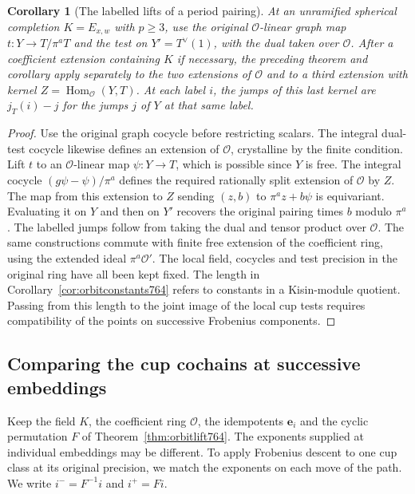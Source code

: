 \documentclass[a4paper,11pt]{article}
\newtheorem{corollary}[proposition]{Corollary}
\theoremstyle{definition}
\theoremstyle{remark}
\numberwithin{equation}{section}
\begin{document}
\begin{corollary}[The labelled lifts of a period pairing]
\leavevmode\label{cor:periodlabels764}
At an unramified spherical completion \(K=E_{x,w}\) with
\(p\ge3\), use the original \(\mathcal O\)-linear graph map
\(t:Y\to T/\pi^aT\) and the test on \(Y'=T^\vee(1)\), with
the dual taken over \(\mathcal O\). After a coefficient
extension containing \(K\) if necessary, the preceding
theorem and corollary apply separately to the two extensions
of \(\mathcal O\) and to a third extension with kernel
\(Z=\operatorname{Hom}_{\mathcal O}(Y,T)\). At each label
\(i\), the jumps of this last kernel are \(j_T(i)-j\) for
the jumps \(j\) of \(Y\) at that same label.
\end{corollary}
\begin{proof}
Use the original graph cocycle before restricting scalars.
The integral dual-test cocycle likewise defines an extension
of \(\mathcal O\), crystalline by the finite condition.
Lift \(t\) to an \(\mathcal O\)-linear map \(\psi:Y\to T\),
which is possible since \(Y\) is free. The integral cocycle
\((g\psi-\psi)/\pi^a\) defines the required rationally
split extension of \(\mathcal O\) by \(Z\). The map from
this extension to \(Z\) sending \((z,b)\) to
\(\pi^a z+b\psi\) is equivariant. Evaluating it on
\(Y\) and then on \(Y'\) recovers the original pairing
times \(b\) modulo \(\pi^a\). The labelled jumps follow
from taking the dual and tensor product over \(\mathcal O\).
The same constructions commute with finite free extension
of the coefficient ring, using the extended ideal
\(\pi^a\mathcal O'\). The local field, cocycles and test
precision in the original ring have all been kept fixed.
The length in Corollary~\ref{cor:orbitconstants764} refers
to constants in a Kisin-module quotient. Passing from this
length to the joint image of the local cup tests requires
compatibility of the points on successive Frobenius components.
\end{proof}
\clearpage

\subsection{Comparing the cup cochains at successive embeddings}
\label{sec:orbitcups765}
Keep the field \(K\), the coefficient ring \(\mathcal O\), the
idempotents \(\mathbf e_i\) and the cyclic permutation \(F\)
of Theorem~\ref{thm:orbitlift764}. The exponents supplied at
individual embeddings may be different. To apply Frobenius
descent to one cup class at its original precision, we match
the exponents on each move of the path. We write \(i^-=F^{-1}i\)
and \(i^+=F i\).
\end{document}
